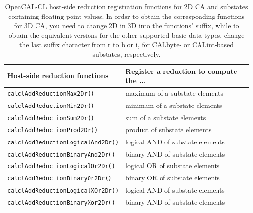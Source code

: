 \begin{table}
  \centering
  \footnotesize
  \begin{tabular}{l|l}
    \hline
    Host-side reduction functions & Register a reduction to compute the ... \\
    \hline
    \verb'calclAddReductionMax2Dr()'        & maximum of a substate elements\\
    \verb'calclAddReductionMin2Dr()'        & minimum of a substate elements\\
    \verb'calclAddReductionSum2Dr()'        & sum of a substate elements\\
    \verb'calclAddReductionProd2Dr()'       & product of substate elements\\
    \verb'calclAddReductionLogicalAnd2Dr()' & logical AND of substate elements\\
    \verb'calclAddReductionBinaryAnd2Dr()'  & binary AND of substate elements\\
    \verb'calclAddReductionLogicalOr2Dr()'  & logical OR of substate elements\\
    \verb'calclAddReductionBinaryOr2Dr()'   & binary OR of substate elements\\
    \verb'calclAddReductionLogicalXOr2Dr()' & logical AND of substate elements\\
    \verb'calclAddReductionBinaryXor2Dr()'  & binary AND of substate elements\\
    \hline
  \end{tabular}
  \caption{OpenCAL-CL host-side reduction registration functions for 2D CA and
    substates containing floating point values. In order to obtain the
    corresponding functions for 3D CA, you need to change 2D in 3D
    into the functions' suffix, while to obtain the equivalent
    versions for the other supported basic data types, change the last
    suffix character from r to b or i, for CALbyte- or CALint-based
    substates, respectively.}
  \label{tab:calcl-host-reductions}
\end{table}


